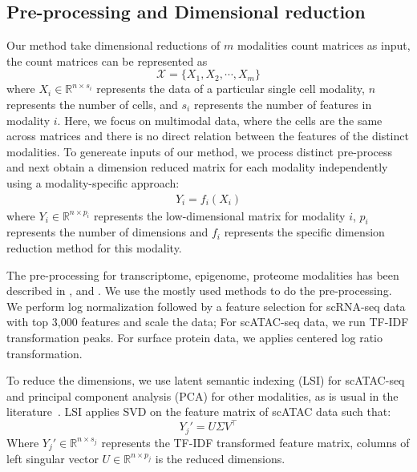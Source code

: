 \subsection{Pre-processing and Dimensional reduction}
Our method take dimensional reductions of $m$ modalities count matrices as input, the count matrices can be represented as
\begin{equation}
    \mathcal{X}=\{X_1,X_2,\cdots,X_m\}
\end{equation}
where $X_{i} \in \mathbb{R}^{n\times s_{i}}$ represents the data of a particular single cell modality, $n$ represents the number of cells, and $s_{i}$ represents the number of features in modality $i$. Here, we focus on multimodal data, where the cells are the same across matrices and there is no direct relation between the features of the distinct modalities. To genereate inputs of our method, we process distinct pre-process and next obtain a dimension reduced matrix for each modality independently using a modality-specific approach: 
\begin{align}
    Y_{i}=f_{i}(X_{i})
\end{align}
where $Y_{i} \in \mathbb{R}^{n\times p_{i}}$ represents the low-dimensional matrix for modality $i$, $p_{i}$ represents the number of dimensions and $f_{i}$ represents the specific dimension reduction method for this modality. 

The pre-processing for transcriptome, epigenome, proteome modalities has been described in ,  and . We use the mostly used methods to do the pre-processing. We perform log normalization followed by a feature selection for scRNA-seq data with top 3,000 features and scale the data; For scATAC-seq data, we run TF-IDF transformation peaks. For surface protein data, we applies centered log ratio transformation. 

To reduce the dimensions, we use latent semantic indexing (LSI) for scATAC-seq and principal component analysis (PCA) for other modalities, as is usual in the literature~\cite{granja2021archr, signac, hao2021seurat4}. LSI applies SVD on the feature matrix of scATAC data such that:
\begin{equation}
    Y_{j}' = U\Sigma V^\top
\end{equation}
Where $Y_{j}'\in \mathbb{R}^{n\times s_{j}}$ represents the TF-IDF transformed feature matrix, columns of left singular vector $U\in \mathbb{R}^{n\times p_j}$ is the reduced dimensions.  

